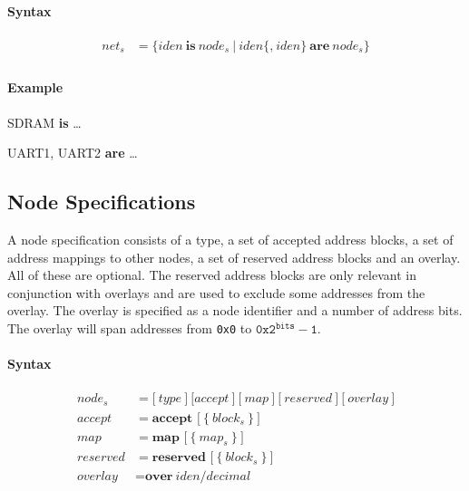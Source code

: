 \documentclass[a4paper,11pt,twoside]{report}
\begin{document}
{{{\paragraph{Syntax}
\begin{align*}
\textit{net}_s & \mathop{=}
    \Big\{
        \textit{iden}\ \textbf{is}\ \textit{node}_s\
    \Big|\
        \textit{iden}\bigl\{\textbf{,}\ \textit{iden}\bigr\}\ \textbf{are}\ \textit{node}_s
    \Big\} \\
\end{align*}

\clearpage
\paragraph{Example}
\begin{example}
    SDRAM \textbf{is} \ldots

    UART1,
    UART2 \textbf{are} \ldots
\end{example}

\subsection{Node Specifications}
A node specification consists of a type, a set of accepted address blocks, a set of address mappings to other nodes, a set of reserved address blocks and an overlay.
All of these are optional.
The reserved address blocks are only relevant in conjunction with overlays and are used to exclude some addresses from the overlay.
The overlay is specified as a node identifier and a number of address bits.
The overlay will span addresses from \texttt{0x0} to \(\texttt{0x2}^\texttt{bits} - \texttt{1}\).

\paragraph{Syntax}
\begin{align*}
\textit{node}_s & \mathop{=}
    \Big[\ 
       \textit{type}\ 
    \Big]\  
    \Big[
       \textit{accept}\ 
    \Big]\ 
    \Big[\ 
       \textit{map}\ 
    \Big]\ 
    \Big[\ 
        \textit{reserved}\ 
    \Big]\ 
    \Big[\ 
        \textit{overlay}\ 
    \Big]\\
\textit{accept} & \mathop{=}
    \textbf{accept [}\ \big\{\ \textit{block}_s\ \big\}\ \textbf{]}\\
\textit{map} & \mathop{=}
    \textbf{map [}\ \big\{\ \textit{map}_s\ \big\}\ \textbf{]}\\
\textit{reserved} & \mathop{=}
    \textbf{reserved [}\ \big\{\ \textit{block}_s\ \big\}\ \textbf{]}\\
\textit{overlay} & \mathop{=}
    \textbf{over}\ \textit{iden}\textbf{/}\textit{decimal}\\
\end{align*}

}}}
\end{document}
